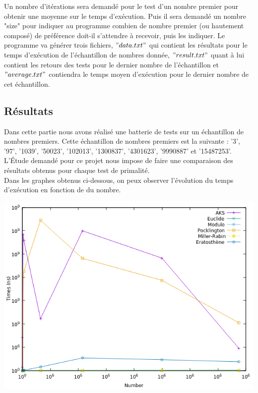 Un nombre d'itérations sera demandé pour le test d'un nombre premier pour obtenir une moyenne sur le temps d'exécution. Puis il sera demandé un nombre "size" pour indiquer au programme combien de nombre premier (ou hautement composé) de préférence doit-il s'attendre à recevoir, puis les indiquer. Le programme va générer trois fichiers, $"data.txt"$ qui contient les résultats pour le temps d'exécution de l'échantillon de nombres donnée, $"result.txt"$ quant à lui contient les retours des tests pour le dernier nombre de l'échantillon et $"average.txt"$ contiendra le temps moyen d'exécution pour le dernier nombre de cet échantillon.
	
		\subsection{Résultats}
	Dans cette partie nous avons réalisé une batterie de tests sur un échantillon de nombres premiers. Cette échantillon de nombres premiers est la suivante : '3', '97', '1039', '50023', '102013', '1300837', '4301623', '9990887' et '15487253'. L’Étude demandé pour ce projet nous impose de faire une comparaison des résultats obtenus pour chaque test de primalité.\\
	Dans les graphes obtenus ci-dessous, on peux observer l'évolution du temps d'exécution en fonction de du nombre.	
	
		\begin{center}\includegraphics[scale=0.6]{result.png}\end{center}
	
